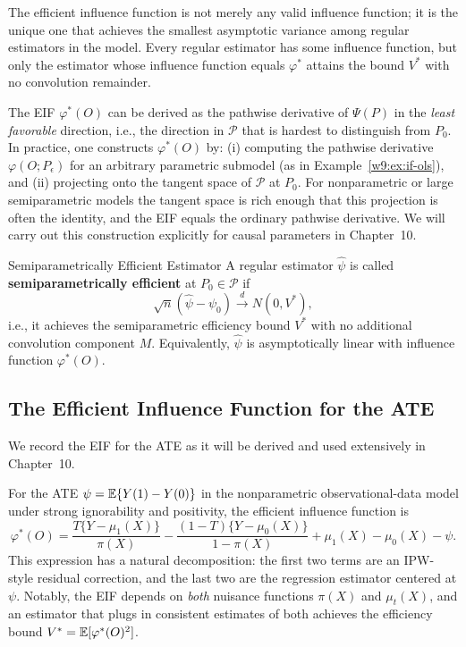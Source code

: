 \documentclass[master.tex]{subfiles}
\begin{document}
The efficient influence function is not merely any valid influence
function; it is the unique one that achieves the smallest asymptotic
variance among regular estimators in the model.  Every regular
estimator has some influence function, but only the estimator whose
influence function equals $\varphi^*$ attains the bound $V^*$ with no
convolution remainder.

\begin{remark}
\label{w9:rem:eif-computation}
The EIF $\varphi^*(O)$ can be derived as the pathwise derivative of
$\Psi(P)$ in the \emph{least favorable} direction, i.e., the direction
in $\mathcal{P}$ that is hardest to distinguish from $P_0$.  In
practice, one constructs $\varphi^*(O)$ by: (i) computing the
pathwise derivative $\varphi(O; P_\epsilon)$ for an arbitrary
parametric submodel (as in Example~\ref{w9:ex:if-ols}), and (ii)
projecting onto the tangent space of $\mathcal{P}$ at $P_0$.  For
nonparametric or large semiparametric models the tangent space is rich
enough that this projection is often the identity, and the EIF equals
the ordinary pathwise derivative.  We will carry out this construction
explicitly for causal parameters in Chapter~10.
\end{remark}

\begin{defn}{Semiparametrically Efficient Estimator}
\label{w9:defn:efficiency}
A regular estimator $\hat\psi$ is called \textbf{semiparametrically
efficient} at $P_0 \in \mathcal{P}$ if
\[
  \sqrt{n}(\hat\psi - \psi_0)
  \overset{d}{\longrightarrow}
  N(0, V^*),
\]
i.e., it achieves the semiparametric efficiency bound $V^*$ with no
additional convolution component $M$.  Equivalently, $\hat\psi$ is
asymptotically linear with influence function $\varphi^*(O)$.
\end{defn}

\subsection{The Efficient Influence Function for the ATE}
\label{w9:subsec:eif-ate}

We record the EIF for the ATE as it will be derived and used
extensively in Chapter~10.

\begin{remark}
\label{w9:rem:eif-ate}
For the ATE $\psi = \mathbb{E}\{Y(1) - Y(0)\}$ in the nonparametric
observational-data model under strong ignorability and positivity, the
efficient influence function is
\[
  \varphi^*(O)
  =
  \frac{T\{Y - \mu_1(X)\}}{\pi(X)}
  - \frac{(1-T)\{Y - \mu_0(X)\}}{1-\pi(X)}
  + \mu_1(X) - \mu_0(X) - \psi.
\]
This expression has a natural decomposition: the first two terms are an
IPW-style residual correction, and the last two are the regression
estimator centered at $\psi$.  Notably, the EIF depends on \emph{both}
nuisance functions $\pi(X)$ and $\mu_t(X)$, and an estimator that
plugs in consistent estimates of both achieves the efficiency bound
$V^* = \mathbb{E}[\varphi^*(O)^2]$.
\end{remark}
\end{document}
